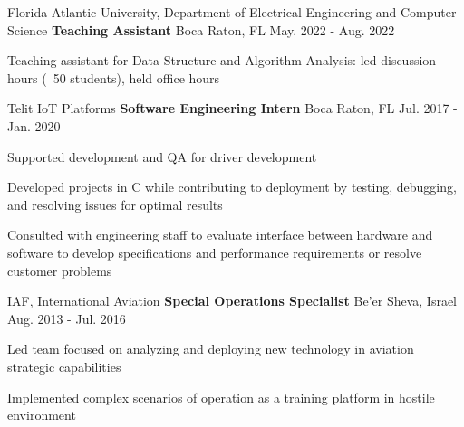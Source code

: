 \begin{cventries}

\cventry
{Florida Atlantic University, Department of Electrical Engineering and Computer Science} %
{\textbf{Teaching Assistant}} %
{Boca Raton, FL} %
{May. 2022 - Aug. 2022} %
{\begin{cvitems}
		\item Teaching assistant for Data Structure and Algorithm Analysis: led discussion hours (~50 students), held office hours
	\end{cvitems}
}


\cventry
{Telit IoT Platforms} %
{\textbf{Software Engineering Intern}} %
{Boca Raton, FL} %
{Jul. 2017 - Jan. 2020} %
{\begin{cvitems}
		\item Supported development and QA for driver development
		\item Developed projects in C while contributing to deployment by testing, debugging, and resolving issues for optimal results
		\item Consulted with engineering staff to evaluate interface between hardware and software to develop specifications and performance requirements or resolve customer problems
\end{cvitems}
}


\cventry
{IAF, International Aviation} %
{\textbf{Special Operations Specialist}} %
{Be'er Sheva, Israel} %
{Aug. 2013 - Jul. 2016} %
{\begin{cvitems}
		\item Led team focused on analyzing and deploying new technology in aviation strategic capabilities
		\item Implemented complex scenarios of operation as a training platform in hostile environment
	\end{cvitems}
}


\end{cventries}